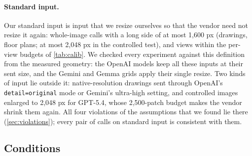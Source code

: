\paragraph{Standard input.} Our standard input is input that we resize ourselves so that the vendor need not resize it again: whole-image calls with a long side of at most 1{,}600 px (drawings, floor plans; at most 2{,}048 px in the controlled test), and views within the per-view budgets of \cref{tab:calib}. We checked every experiment against this definition from the measured geometry: the OpenAI models keep all these inputs at their sent size, and the Gemini and Gemma grids apply their single resize. Two kinds of input lie outside it: native-resolution drawings sent through OpenAI's \texttt{detail=original} mode or Gemini's ultra-high setting, and controlled images enlarged to 2{,}048 px for GPT-5.4, whose 2{,}500-patch budget makes the vendor shrink them again. All four violations of the assumptions that we found lie there (\cref{sec:violations}); every pair of calls on standard input is consistent with them.

\subsection{Conditions}
\label{sec:conditions}

